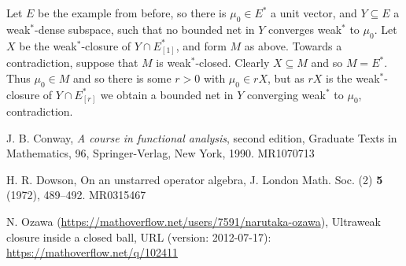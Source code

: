 \documentclass[a4paper,12pt]{article}
\theoremstyle{plain}
\theoremstyle{definition}
\begin{document}
Let $E$ be the example from before, so there is $\mu_0\in E^*$ a unit vector,
and $Y\subseteq E$ a weak$^*$-dense subspace, such that no bounded net in $Y$ converges weak$^*$ to
$\mu_0$.  Let $X$ be the weak$^*$-closure of $Y \cap E^*_{[1]}$, and form $M$ as above.  Towards
a contradiction, suppose that $M$ is weak$^*$-closed.  Clearly $X\subseteq M$ and so $M = E^*$.
Thus $\mu_0\in M$ and so there is some $r>0$ with $\mu_0 \in rX$, but as $rX$ is the weak$^*$-closure
of $Y \cap E^*_{[r]}$ we obtain a bounded net in $Y$ converging weak$^*$ to $\mu_0$, contradiction.



\begin{thebibliography}{aa}

 J. B. Conway, {\it A course in functional analysis}, second edition, Graduate Texts in Mathematics, 96, Springer-Verlag, New York, 1990. MR1070713

 H. R. Dowson, On an unstarred operator algebra, J. London Math. Soc. (2) {\bf 5} (1972), 489--492. MR0315467

 N. Ozawa (\url{https://mathoverflow.net/users/7591/narutaka-ozawa}), Ultraweak closure inside a closed ball, URL (version: 2012-07-17): \url{https://mathoverflow.net/q/102411}


\end{thebibliography}
\end{document}
